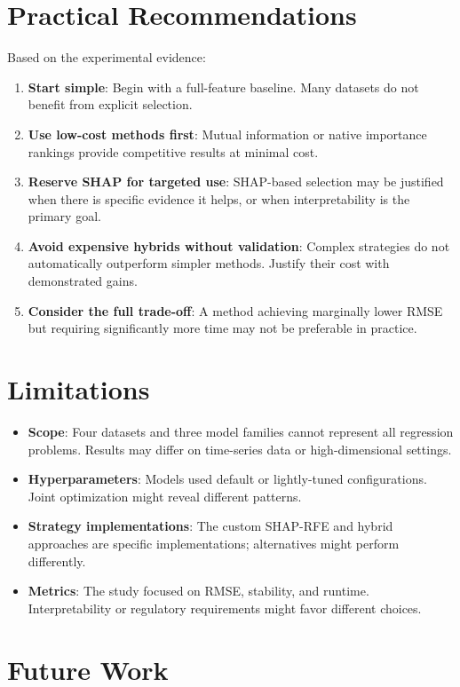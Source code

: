 \section{Practical Recommendations}

Based on the experimental evidence:
\begin{enumerate}
    \item \textbf{Start simple}: Begin with a full-feature baseline. Many datasets do not benefit from explicit selection.
    \item \textbf{Use low-cost methods first}: Mutual information or native importance rankings provide competitive results at minimal cost.
    \item \textbf{Reserve SHAP for targeted use}: SHAP-based selection may be justified when there is specific evidence it helps, or when interpretability is the primary goal.
    \item \textbf{Avoid expensive hybrids without validation}: Complex strategies do not automatically outperform simpler methods. Justify their cost with demonstrated gains.
    \item \textbf{Consider the full trade-off}: A method achieving marginally lower RMSE but requiring significantly more time may not be preferable in practice.
\end{enumerate}

\section{Limitations}

\begin{itemize}
    \item \textbf{Scope}: Four datasets and three model families cannot represent all regression problems. Results may differ on time-series data or high-dimensional settings.
    \item \textbf{Hyperparameters}: Models used default or lightly-tuned configurations. Joint optimization might reveal different patterns.
    \item \textbf{Strategy implementations}: The custom SHAP-RFE and hybrid approaches are specific implementations; alternatives might perform differently.
    \item \textbf{Metrics}: The study focused on RMSE, stability, and runtime. Interpretability or regulatory requirements might favor different choices.
\end{itemize}

\section{Future Work}

